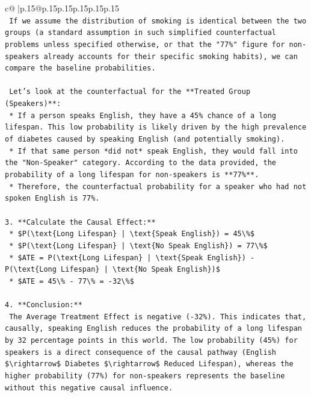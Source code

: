 \documentclass{article}
\begin{document}
{\begin{supertabular}{c@{$\;$}|p{.15\linewidth}@{}p{.15\linewidth}p{.15\linewidth}p{.15\linewidth}p{.15\linewidth}p{.15\linewidth}}
{{{\\ 
\texttt{    If we assume the distribution of smoking is identical between the two groups (a standard assumption in such simplified counterfactual problems unless specified otherwise, or that the "77\%" figure for non{-}speakers already accounts for their specific smoking habits), we can compare the baseline probabilities.} \\
\\ 
\texttt{    Let's look at the counterfactual for the **Treated Group (Speakers)**:} \\
\texttt{    *   If a person speaks English, they have a 45\% chance of a long lifespan. This low probability is likely driven by the high prevalence of diabetes caused by speaking English (and potentially smoking).} \\
\texttt{    *   If that same person *did not* speak English, they would fall into the "Non{-}Speaker" category. According to the data provided, the probability of a long lifespan for non{-}speakers is **77\%**.} \\
\texttt{    *   Therefore, the counterfactual probability for a speaker who had not spoken English is 77\%.} \\
\\ 
\texttt{3.  **Calculate the Causal Effect:**} \\
\texttt{    *   \$P(\textbackslash{}text\{Long Lifespan\} | \textbackslash{}text\{Speak English\}) = 45\textbackslash{}\%\$} \\
\texttt{    *   \$P(\textbackslash{}text\{Long Lifespan\} | \textbackslash{}text\{No Speak English\}) = 77\textbackslash{}\%\$} \\
\texttt{    *   \$ATE = P(\textbackslash{}text\{Long Lifespan\} | \textbackslash{}text\{Speak English\}) {-} P(\textbackslash{}text\{Long Lifespan\} | \textbackslash{}text\{No Speak English\})\$} \\
\texttt{    *   \$ATE = 45\textbackslash{}\% {-} 77\textbackslash{}\% = {-}32\textbackslash{}\%\$} \\
\\ 
\texttt{4.  **Conclusion:**} \\
\texttt{    The Average Treatment Effect is negative ({-}32\%). This indicates that, causally, speaking English reduces the probability of a long lifespan by 32 percentage points in this world. The low probability (45\%) for speakers is a direct consequence of the causal pathway (English \$\textbackslash{}rightarrow\$ Diabetes \$\textbackslash{}rightarrow\$ Reduced Lifespan), whereas the higher probability (77\%) for non{-}speakers represents the baseline without this negative causal influence.} \\
}}}
\end{supertabular}}
\end{document}
